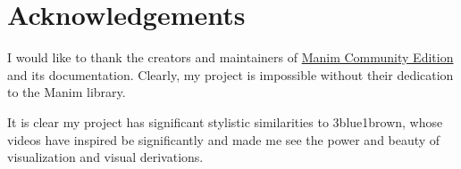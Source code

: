 \documentclass{article}
\begin{document}
\section{Acknowledgements}

I would like to thank the creators and maintainers of \href{https://www.manim.community/}{Manim Community Edition} and its documentation. Clearly, my project is impossible without their dedication to the Manim library.

It is clear my project has significant stylistic similarities to 3blue1brown, whose videos have inspired be significantly and made me see the power and beauty of visualization and visual derivations.

\newpage
\end{document}
